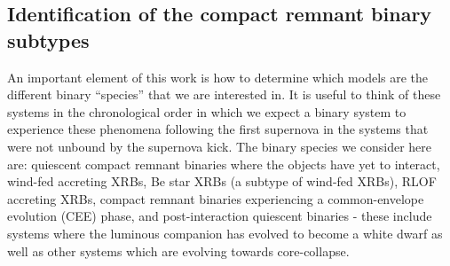 \documentclass{pas}
\begin{document}
\subsection{Identification of the compact remnant binary subtypes}\label{binaryspeciesmethod}

An important element of this work is how to determine which models are the different binary ``species'' that we are interested in. It is useful to think of these systems in the chronological order in which we expect a binary system to experience these phenomena following the first supernova in the systems that were not unbound by the supernova kick. The binary species we consider here are: quiescent compact remnant binaries where the objects have yet to interact, wind-fed accreting XRBs, Be star XRBs (a subtype of wind-fed XRBs), RLOF accreting XRBs, compact remnant binaries experiencing a common-envelope evolution (CEE) phase, and post-interaction quiescent binaries - these include systems where the luminous companion has evolved to become a white dwarf as well as other systems which are evolving towards core-collapse. 
\end{document}
